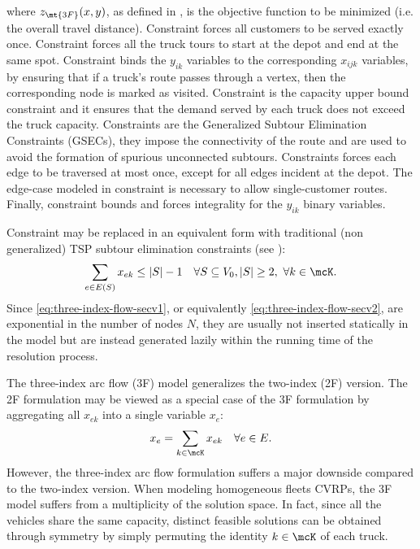 where $z_\mt{3F}(x, y)$, as defined in , is the objective function to be minimized (i.e. the overall travel distance).
Constraint  forces all customers to be served exactly once.
Constraint  forces all the truck tours to start at the depot and end at the same spot.
Constraint  binds the $y_{ik}$ variables to the corresponding $x_{ijk}$ variables, by ensuring that if a truck's route passes through a vertex, then the corresponding node is marked as visited.
Constraint  is the capacity upper bound constraint and it ensures that the demand served by each truck does not exceed the truck capacity.
Constraints  are the Generalized Subtour Elimination Constraints (GSECs), they impose the connectivity of the route and are used to avoid the formation of spurious unconnected subtours.
Constraints  forces each edge to be traversed at most once,
except for all edges incident at the depot.
The edge-case modeled in constraint 
is necessary to allow single-customer routes.
Finally, constraint 
bounds and forces integrality for the $y_{ik}$ binary variables.

Constraint  may be replaced in an equivalent form
with traditional (non generalized) TSP subtour elimination constraints (see \cite{fisher1981}):
\begin{equation}\label{eq:three-index-flow-secv2}
	\sum_{e \in E(S)} x_{ek} \le |S| - 1 \quad \forall S \subseteq V_0, |S| \ge 2,\ \forall k \in \mcK.
\end{equation}
Since \cref{eq:three-index-flow-secv1}, or equivalently \cref{eq:three-index-flow-secv2},
are exponential in the number of nodes $N$,
they are usually not inserted statically in the model
but are instead generated lazily within the running time of the resolution process.

The three-index arc flow (3F) model generalizes the two-index (2F) version.
The 2F formulation may be viewed as a special case of the 3F formulation by aggregating
all $x_{ek}$ into a single variable $x_e$:
\begin{equation}
	x_e = \sum_{k \in \mcK} x_{ek} \quad \forall e \in E.
\end{equation}
However, the three-index arc flow formulation suffers a major downside compared to the two-index version.
When modeling homogeneous fleets CVRPs, the 3F model suffers from a multiplicity of the solution space.
In fact, since all the vehicles share the same capacity,
distinct feasible solutions can be obtained through symmetry
by simply permuting the identity $k \in \mcK$ of each truck.

